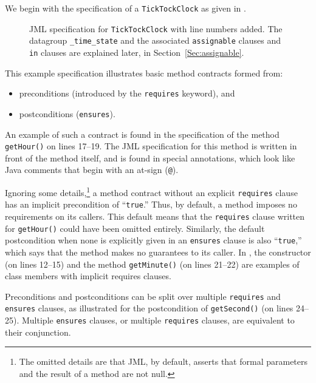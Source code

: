 \documentclass{llncs}
\begin{document}
%
We begin with the specification of a \texttt{TickTockClock} as given in
.
\begin{figure}[tbp]
%
%
\vspace*{-2ex} %
\caption{JML specification for \texttt{TickTockClock} with line
  numbers added. The datagroup \texttt{\_time\_state} and the
  associated \texttt{assignable} clauses and \texttt{in} clauses are
  explained later, in Section~\ref{Sec:assignable}.} 
\label{Example:TickTockClock}
\end{figure}
This example specification illustrates basic
method contracts formed from:
%
\begin{itemize}
  \item preconditions (introduced by the \texttt{requires} keyword), and
  \item postconditions (\texttt{ensures}).
\end{itemize}
An example of such a contract is found in the specification of the
method \texttt{getHour()} on lines 17--19.  The JML specification for
this method is written in front of the method itself, and is found in
special annotations, which look like Java comments that begin with an
at-sign (\texttt{@}).

Ignoring some details,\footnote{
The omitted details are that JML, by default, asserts that formal
parameters and the result of a method are not null.
}
% 
%
a method contract without an explicit \texttt{requires} clause has
an implicit precondition of ``\texttt{true}.''  Thus, by default, a
method imposes no requirements on its callers.  This default means
that the \texttt{requires} clause written for \texttt{getHour()} could
have been omitted entirely.
Similarly, the default postcondition 
when none is explicitly given in an \texttt{ensures} clause is also
``\texttt{true},'' which says that the method makes no guarantees to
its caller.
In , the constructor (on lines 12--15)
and the method \texttt{getMinute()} (on lines 21--22) are
examples of class members with implicit requires clauses.

Preconditions and postconditions can be split over multiple \texttt{requires}
and \texttt{ensures} clauses, as illustrated for the postcondition of 
\texttt{getSecond()} (on lines 24--25).  Multiple \texttt{ensures}
clauses, or multiple \texttt{requires} clauses, are equivalent to
their conjunction. 
\end{document}
